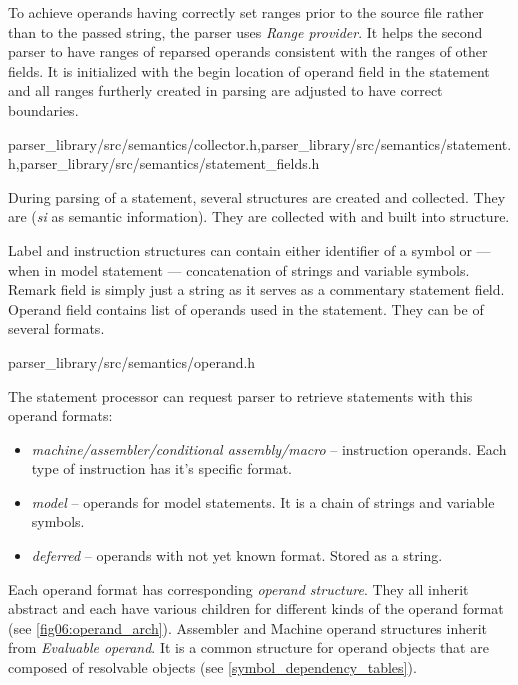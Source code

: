 To achieve operands having correctly set ranges prior to the source file rather than to the passed string, the parser uses \emph{Range provider}. It helps the second parser to have ranges of reparsed operands consistent with the ranges of other fields. It is initialized with the begin location of operand field in the statement and all ranges furtherly created in parsing are adjusted to have correct boundaries.

{parser\_library/src/semantics/collector.h,parser\_library/src/semantics/statement.h,parser\_library/src/semantics/statement\_fields.h}

During parsing of a statement, several structures are created and collected. They are  (\emph{si} as semantic information). They are collected with  and built into  structure.

Label and instruction structures can contain either identifier of a symbol or --- when in model statement --- concatenation of strings and variable symbols. Remark field is simply just a string as it serves as a commentary statement field. Operand field contains list of operands used in the statement. They can be of several formats.

{parser\_library/src/semantics/operand.h}

The statement processor can request parser to retrieve statements with this operand formats:
\begin{itemize}
	\item \emph{machine/assembler/conditional assembly/macro} -- instruction operands. Each type of instruction has it's specific format.
	\item \emph{model} -- operands for model statements. It is a chain of strings and variable symbols.
	\item \emph{deferred} -- operands with not yet known format. Stored as a string.
\end{itemize}

Each operand format has corresponding \emph{operand structure}. They all inherit abstract  and each have various children for different kinds of the operand format (see \cref{fig06:operand_arch}). Assembler and Machine operand structures inherit from \emph{Evaluable operand}. It is a common structure for operand objects that are composed of resolvable objects (see \cref{symbol_dependency_tables}).

